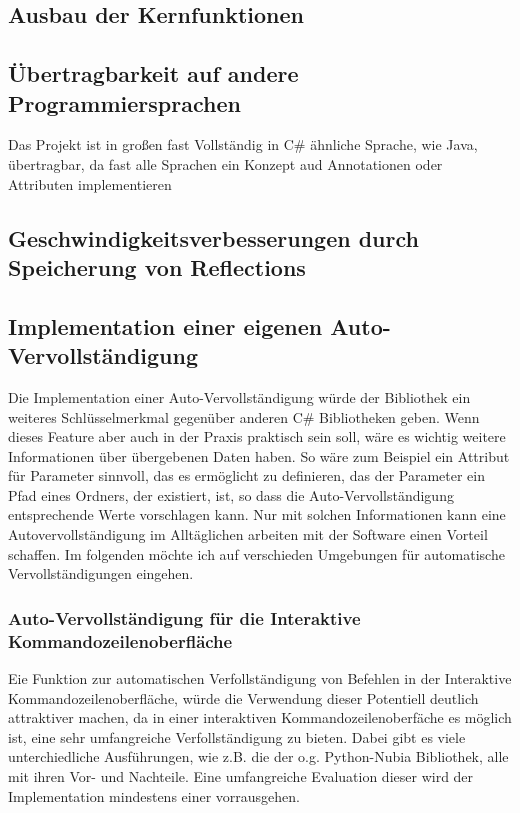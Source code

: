 \documentclass[a4paper,11pt,titlepage,ngerman]{article}
\begin{document}
\begin{sloppypar}
  \subsection{Ausbau der Kernfunktionen}\label{subsec:MoreFunctions}
  \subsection{Übertragbarkeit auf andere Programmiersprachen}\label{subsec:PortabilityToOtherLangs}
  Das Projekt ist in gro\ss en fast Vollständig in C\# ähnliche Sprache, wie Java, übertragbar, da fast alle Sprachen ein Konzept aud Annotationen oder Attributen implementieren 
  \subsection{Geschwindigkeitsverbesserungen durch Speicherung von Reflections}\label{subsec:StoringReflections}
  \subsection{Implementation einer eigenen Auto-Vervollständigung}\label{subsec:Autocomplete}
  Die Implementation einer Auto-Vervollständigung würde der Bibliothek ein weiteres Schlüsselmerkmal gegenüber anderen C\# Bibliotheken geben.
  Wenn dieses Feature aber auch in der Praxis praktisch sein soll, wäre es wichtig weitere Informationen über übergebenen Daten haben.
  So wäre zum Beispiel ein Attribut für Parameter sinnvoll, das es ermöglicht zu definieren, das der Parameter ein Pfad eines Ordners, 
  der existiert, ist, so dass die Auto-Vervollständigung entsprechende Werte vorschlagen kann.
  Nur mit solchen Informationen kann eine Autovervollständigung im Alltäglichen arbeiten mit der Software einen Vorteil schaffen.
  Im folgenden möchte ich auf verschieden Umgebungen für automatische Vervollständigungen eingehen.
  \subsubsection{Auto-Vervollständigung für die Interaktive Kommandozeilenoberfläche}
  Eie Funktion zur automatischen Verfollständigung von Befehlen in der Interaktive Kommandozeilenoberfläche, würde die Verwendung dieser Potentiell deutlich attraktiver machen, 
  da in einer interaktiven Kommandozeilenoberfäche es möglich ist, eine sehr umfangreiche Verfollständigung zu bieten.
  Dabei gibt es viele unterchiedliche Ausführungen, wie z.B. die der o.g. Python-Nubia Bibliothek, alle mit ihren Vor- und Nachteile.
  Eine umfangreiche Evaluation dieser wird der Implementation mindestens einer vorrausgehen. 

\end{sloppypar}
\end{document}
